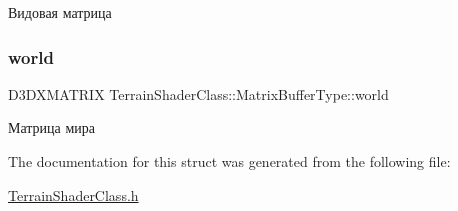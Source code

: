 Видовая матрица 

\mbox{\label{struct_terrain_shader_class_1_1_matrix_buffer_type_a64a50843d3023e4ad05231c9e482ed63}} 
\subsubsection{\texorpdfstring{world}{world}}
{\footnotesize\ttfamily D3\+D\+X\+M\+A\+T\+R\+IX Terrain\+Shader\+Class\+::\+Matrix\+Buffer\+Type\+::world}



Матрица мира 



The documentation for this struct was generated from the following file\+:\begin{DoxyCompactItemize}
\item 
\hyperlink{_terrain_shader_class_8h}{Terrain\+Shader\+Class.\+h}\end{DoxyCompactItemize}
